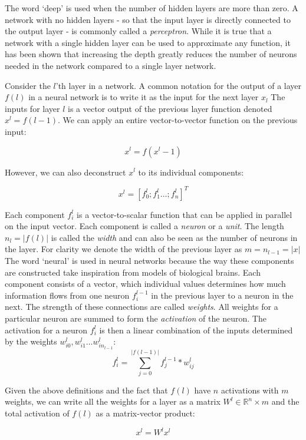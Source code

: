 The word `deep' is used when the number of hidden layers are more than zero. A network with no hidden layers - so that the input layer is directly connected to the output layer - is commonly called a \emph{perceptron}. While it is true that a network with a single hidden layer can be used to approximate any function, it has been shown that increasing the depth greatly reduces the number of neurons needed in the network compared to a single layer network. %

Consider the $l$'th layer in a network. A common notation for the output of a layer $f(l)$ in a neural network is to write it as the input for the next layer $x_l$ The inputs for layer $l$ is a vector output of the previous layer function denoted $x^l = f(l-1)$. We can apply an entire vector-to-vector function on the previous input:

$$
x^l = f(x^l-1)
$$

However, we can also deconstruct $x^l$ to its individual components:

$$ 
x^l =  [f_{0}^{l};f_{1}^{l}\ldots;f_{n}^{l}]^T 
$$ 

Each component $f_i^l$ is a vector-to-scalar function that can be applied in parallel on the input vector. Each component is called a \emph{neuron} or a \emph{unit}. The length $n_l = |f(l)|$ is called the \emph{width} and can also be seen as the number of neurons in the layer. For clarity we denote the width of the previous layer as $m = n_{l-1} = |x|$  
The word `neural' is used in neural networks because the way these components are constructed take inspiration from models of biological brains. Each component consists of a vector, which individual values determines how much information flows from one neuron $f_{i}^{l-1}$ in the previous layer to a neuron in the next. The strength of these connections are called \emph{weights}. All weights for a particular neuron are summed to form the \emph{activation} of the neuron. The activation for a neuron $f_{i}^l$ is then a linear combination of the inputs determined by the weights $w_{i0}^l, w_{i1}^l \ldots w_{in_{l-1}}^l$:
$$
    f_{i}^{l} =  \sum_{j=0}^{|f(l-1)|} f_j^{l-1} * w_{ij}^l 
$$

Given the above definitions and the fact that $f(l)$ have $n$ activations with $m$ weights, we can write all the weights for a layer as a matrix $W^l \in \mathbb{R}^n \times m $ and the total activation of $f(l)$ as a matrix-vector product:

$$
    x^l = W^lx^l
$$   

